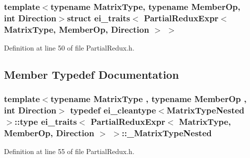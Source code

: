 \subsubsection*{template$<$typename Matrix\-Type, typename Member\-Op, int Direction$>$struct ei\-\_\-traits$<$ Partial\-Redux\-Expr$<$ Matrix\-Type, Member\-Op, Direction $>$ $>$}



Definition at line 50 of file Partial\-Redux.\-h.



\subsection{Member Typedef Documentation}
\hypertarget{structei__traits_3_01_partial_redux_expr_3_01_matrix_type_00_01_member_op_00_01_direction_01_4_01_4_ac762a6a484f857cb532f8b1aa615e5a5}{
\subsubsection[{\-\_\-\-Matrix\-Type\-Nested}]{\setlength{\rightskip}{0pt plus 5cm}template$<$typename Matrix\-Type , typename Member\-Op , int Direction$>$ typedef {\bf ei\-\_\-cleantype}$<${\bf Matrix\-Type\-Nested}$>$\-::{\bf type} {\bf ei\-\_\-traits}$<$ {\bf Partial\-Redux\-Expr}$<$ Matrix\-Type, Member\-Op, Direction $>$ $>$\-::{\bf \-\_\-\-Matrix\-Type\-Nested}}}\label{structei__traits_3_01_partial_redux_expr_3_01_matrix_type_00_01_member_op_00_01_direction_01_4_01_4_ac762a6a484f857cb532f8b1aa615e5a5}


Definition at line 55 of file Partial\-Redux.\-h.

